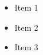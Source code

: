 \documentclass[10pt]{article}
\begin{document}
\begin{itemize}
\item Item 1
\item Item 2
\item Item 3
\end{itemize}
\end{document}
